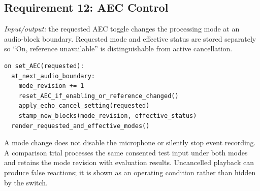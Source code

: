 \subsection{Requirement 12: AEC Control}
\textit{Input/output:} the requested AEC toggle changes the processing mode at an audio-block boundary. Requested mode and effective status are stored separately so ``On, reference unavailable'' is distinguishable from active cancellation.
\par\smallskip\noindent\begin{minipage}{\columnwidth}
\begin{lstlisting}
on set_AEC(requested):
  at_next_audio_boundary:
    mode_revision += 1
    reset_AEC_if_enabling_or_reference_changed()
    apply_echo_cancel_setting(requested)
    stamp_new_blocks(mode_revision, effective_status)
  render_requested_and_effective_modes()
\end{lstlisting}
\end{minipage}\par
A mode change does not disable the microphone or silently stop event recording. A comparison trial processes the same consented test input under both modes and retains the mode revision with evaluation results. Uncancelled playback can produce false reactions; it is shown as an operating condition rather than hidden by the switch.

